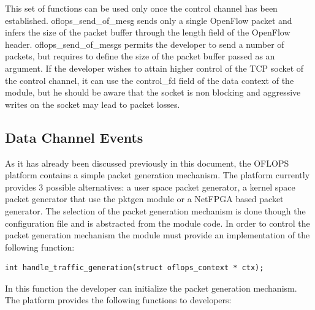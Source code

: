 \documentclass{book}
\begin{document}
This set of functions can be used only once the control channel has been established. oflops\_send\_of\_mesg sends only a single 
OpenFlow packet and infers the size of the packet buffer through the length field of the OpenFlow header. oflops\_send\_of\_mesgs
permits the developer to send a number of packets, but requires to define the
size of the packet buffer passed as an argument. 
If the developer wishes to attain higher control of the TCP socket of the
control channel, it can use the control\_fd field of the
data context of the module, but he should be aware that the socket is non blocking and aggressive writes on the socket may lead 
to packet losses. 

\subsection{Data Channel Events}

As it has already been discussed previously in this document, the OFLOPS platform contains a simple packet generation 
mechanism. The platform currently provides 3 possible alternatives: a user space packet generator, a kernel space packet generator
that use the pktgen module or a NetFPGA based packet generator. The selection
of the packet generation mechanism is done though the 
configuration file and is abstracted from the module code. In order to control the packet generation mechanism the module must 
provide an implementation of the following function:

\begin{lstlisting}[caption={traffic generation event callback}]
int handle_traffic_generation(struct oflops_context * ctx);
\end{lstlisting}

In this function the developer can initialize the packet generation mechanism. The platform provides the following functions 
to developers:
\end{document}
